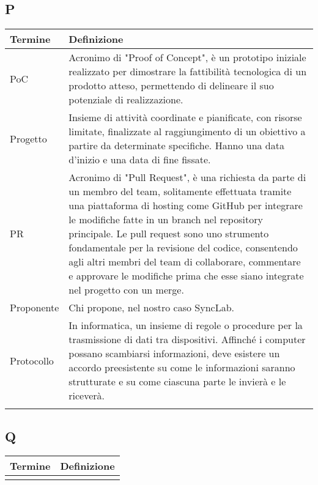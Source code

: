 \documentclass[10pt]{article}
\begin{document}
\subsection{P} %
\begin{tabularx}{\textwidth}{|>{\centering\arraybackslash}l|X|}
\hline
\rowcolor[gray]{0.8}
\textbf{Termine} & \textbf{Definizione}\\
\hline
PoC & Acronimo di "Proof of Concept", è un prototipo iniziale realizzato per dimostrare la fattibilità tecnologica di un prodotto atteso, permettendo di delineare il suo potenziale di realizzazione.\\
\hline
Progetto & Insieme di attività coordinate e pianificate, con risorse limitate, finalizzate al raggiungimento di un obiettivo a partire da determinate specifiche. Hanno una data d'inizio e una data di fine fissate.\\
\hline
PR & Acronimo di "Pull Request", è una richiesta da parte di un membro del team, solitamente effettuata tramite una piattaforma di hosting come GitHub per integrare le modifiche fatte in un branch nel repository principale. Le pull request sono uno strumento fondamentale per la revisione del codice, consentendo agli altri membri del team di collaborare, commentare e approvare le modifiche prima che esse siano integrate nel progetto con un merge.\\
\hline
Proponente & Chi propone, nel nostro caso SyncLab.\\
\hline
Protocollo & In informatica, un insieme di regole o procedure per la trasmissione di dati tra dispositivi. Affinché i computer possano scambiarsi informazioni, deve esistere un accordo preesistente su come le informazioni saranno strutturate e su come ciascuna parte le invierà e le riceverà.\\
\hline
 & \\
\hline
\end{tabularx}

\subsection{Q} %
\begin{tabularx}{\textwidth}{|>{\centering\arraybackslash}l|X|}
\hline
\rowcolor[gray]{0.8}
\textbf{Termine} & \textbf{Definizione}\\
\hline
 & \\
\hline
\end{tabularx}
\end{document}
